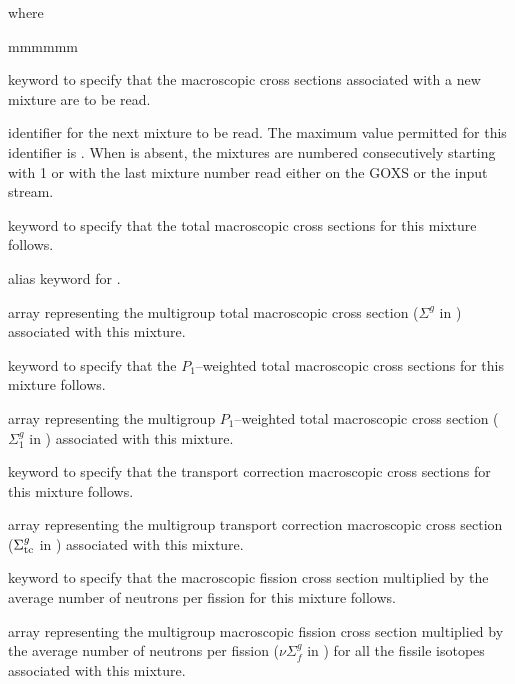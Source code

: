 \noindent where
\begin{ListeDeDescription}{mmmmmm}

\item[\moc{MIX}] keyword to specify that the macroscopic cross sections
associated with a new mixture are to be read.

\item[\dusa{matnum}] identifier for the next mixture to be read. The maximum
value permitted for this identifier is . When  is
absent, the mixtures are numbered consecutively starting with 1 or with the last
mixture number read either on the GOXS or the input stream.  

\item[\moc{NTOT0}] keyword to specify that the total macroscopic cross
sections for this mixture follows.

\item[\moc{TOTAL}] alias keyword for .

\item[\dusa{xssigt}] array representing the multigroup total macroscopic cross
section ($\Sigma^{g}$ in \xsunit) associated with this mixture.

\item[\moc{NTOT1}] keyword to specify that the $P_1$--weighted total macroscopic cross
sections for this mixture follows.

\item[\dusa{xssig1}] array representing the multigroup $P_1$--weighted total macroscopic cross
section ($\Sigma_1^{g}$ in \xsunit) associated with this mixture.

\item[\moc{TRANC}] keyword to specify that the transport correction macroscopic cross
sections for this mixture follows.

\item[\dusa{xsstra}] array representing the multigroup transport correction macroscopic cross
section ($\Sigma_{\rm tc}^{g}$ in \xsunit) associated with this mixture.

\item[\moc{NUSIGF}] keyword to specify that the macroscopic fission cross
section multiplied by the average number of neutrons per fission for this
mixture follows.

\item[\dusa{xssigf}] array representing the multigroup macroscopic fission
cross section multiplied by the average number
of neutrons per fission ($\nu\Sigma_{f}^{g}$ in \xsunit) for all the fissile
isotopes associated with this mixture. 


\end{ListeDeDescription}
